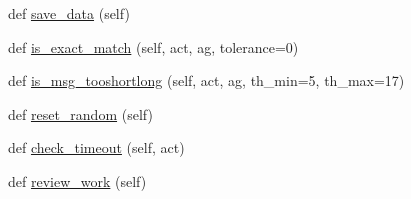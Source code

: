 \begin{DoxyCompactItemize}
def \hyperlink{classparlai_1_1mturk_1_1tasks_1_1personachat_1_1personachat__chat_1_1worlds_1_1PersonaChatWorld_ad0266a390c3789b1351a19b8bcad2696}{save\+\_\+data} (self)
\item 
def \hyperlink{classparlai_1_1mturk_1_1tasks_1_1personachat_1_1personachat__chat_1_1worlds_1_1PersonaChatWorld_a5edf0526e8aad41c00289548253d51e9}{is\+\_\+exact\+\_\+match} (self, act, ag, tolerance=0)
\item 
def \hyperlink{classparlai_1_1mturk_1_1tasks_1_1personachat_1_1personachat__chat_1_1worlds_1_1PersonaChatWorld_a7f6c59f2e1f897e1e480b43fc67680df}{is\+\_\+msg\+\_\+tooshortlong} (self, act, ag, th\+\_\+min=5, th\+\_\+max=17)
\item 
def \hyperlink{classparlai_1_1mturk_1_1tasks_1_1personachat_1_1personachat__chat_1_1worlds_1_1PersonaChatWorld_a3882e622e065f27421c5b2105558471a}{reset\+\_\+random} (self)
\item 
def \hyperlink{classparlai_1_1mturk_1_1tasks_1_1personachat_1_1personachat__chat_1_1worlds_1_1PersonaChatWorld_a2d3f943d1fd0d1bff5af9fdcae160439}{check\+\_\+timeout} (self, act)
\item 
def \hyperlink{classparlai_1_1mturk_1_1tasks_1_1personachat_1_1personachat__chat_1_1worlds_1_1PersonaChatWorld_a17e4312c4028bb75b1b1bc7f83557509}{review\+\_\+work} (self)
\end{DoxyCompactItemize}
